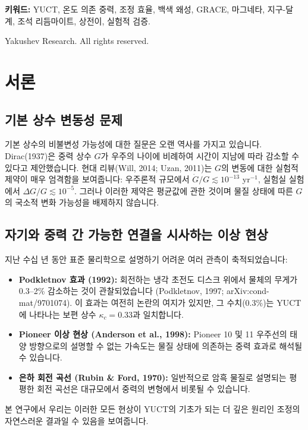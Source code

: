 \documentclass[11pt,a4paper]{article}
\newcommand{\kappac}{\kappa_c}
\begin{document}
\begin{titlepage}
		\vspace{0.3cm}
		\noindent
		\small\textbf{키워드:} YUCT, 온도 의존 중력, 조정 효율, 백색 왜성, GRACE, 마그네타, 지구-달 계, 조석 리듬마이트, 상전이, 실험적 검증.
		
		\vspace{0.1cm}
		\noindent
		 Yakushev Research. All rights reserved.
	\end{titlepage}
	
	\tableofcontents
	\newpage
	
	\section{서론}
	\label{sec:intro}
	
	\subsection{기본 상수 변동성 문제}
	\label{subsec:constants-variation}
	
	기본 상수의 비불변성 가능성에 대한 질문은 오랜 역사를 가지고 있습니다. Dirac(1937)은 중력 상수 $G$가 우주의 나이에 비례하여 시간이 지남에 따라 감소할 수 있다고 제안했습니다. 현대 리뷰(Will, 2014; Uzan, 2011)는 $G$의 변동에 대한 실험적 제약이 매우 엄격함을 보여줍니다: 우주론적 규모에서 $\dot{G}/G \lesssim 10^{-13}$ yr$^{-1}$, 실험실 실험에서 $\Delta G/G \lesssim 10^{-5}$. 그러나 이러한 제약은 평균값에 관한 것이며 물질 상태에 따른 $G$의 국소적 변화 가능성을 배제하지 않습니다.
	
	\subsection{자기와 중력 간 가능한 연결을 시사하는 이상 현상}
	\label{subsec:anomalies}
	
	지난 수십 년 동안 표준 물리학으로 설명하기 어려운 여러 관측이 축적되었습니다:
	\begin{itemize}
		\item \textbf{Podkletnov 효과 (1992):} 회전하는 냉각 초전도 디스크 위에서 물체의 무게가 0.3–2\% 감소하는 것이 관찰되었습니다 (Podkletnov, 1997; arXiv:cond-mat/9701074). 이 효과는 여전히 논란의 여지가 있지만, 그 수치(0.3\%)는 YUCT에 나타나는 보편 상수 $\kappac = 0.33$과 일치합니다.
		\item \textbf{Pioneer 이상 현상 (Anderson et al., 1998):} Pioneer 10 및 11 우주선의 태양 방향으로의 설명할 수 없는 가속도는 물질 상태에 의존하는 중력 효과로 해석될 수 있습니다.
		\item \textbf{은하 회전 곡선 (Rubin \& Ford, 1970):} 일반적으로 암흑 물질로 설명되는 평평한 회전 곡선은 대규모에서 중력의 변형에서 비롯될 수 있습니다.
	\end{itemize}
	본 연구에서 우리는 이러한 모든 현상이 YUCT의 기초가 되는 더 깊은 원리인 조정의 자연스러운 결과일 수 있음을 보여줍니다.
	
\end{document}

